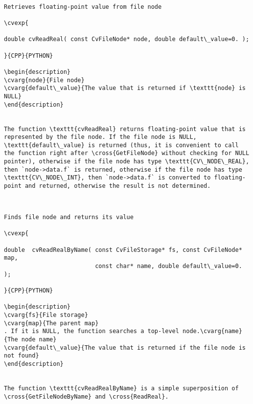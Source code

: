 \begin{verbatim}

Retrieves floating-point value from file node

\cvexp{

double cvReadReal( const CvFileNode* node, double default\_value=0. );

}{CPP}{PYTHON}

\begin{description}
\cvarg{node}{File node}
\cvarg{default\_value}{The value that is returned if \texttt{node} is NULL}
\end{description}


The function \texttt{cvReadReal} returns floating-point value that is represented by the file node. If the file node is NULL, \texttt{default\_value} is returned (thus, it is convenient to call the function right after \cross{GetFileNode} without checking for NULL pointer), otherwise if the file node has type \texttt{CV\_NODE\_REAL}, then `node->data.f` is returned, otherwise if the file node has type \texttt{CV\_NODE\_INT}, then `node->data.f` is converted to floating-point and returned, otherwise the result is not determined.


\end{verbatim}
\begin{verbatim}

Finds file node and returns its value

\cvexp{

double  cvReadRealByName( const CvFileStorage* fs, const CvFileNode* map,
                          const char* name, double default\_value=0. );

}{CPP}{PYTHON}

\begin{description}
\cvarg{fs}{File storage}
\cvarg{map}{The parent map}
. If it is NULL, the function searches a top-level node.\cvarg{name}{The node name}
\cvarg{default\_value}{The value that is returned if the file node is not found}
\end{description}


The function \texttt{cvReadRealByName} is a simple superposition of \cross{GetFileNodeByName} and \cross{ReadReal}.


\end{verbatim}
